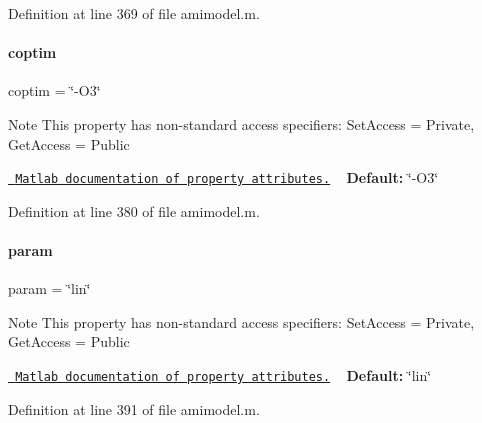 Definition at line 369 of file amimodel.\+m.

\mbox{\label{classamimodel_ad99abcd270ac97546c46292ebc6c2e0a}} 
\paragraph{\texorpdfstring{coptim}{coptim}}
{\footnotesize\ttfamily coptim = \char`\"{}-\/O3\char`\"{}}

\begin{DoxyNote}{Note}
This property has non-\/standard access specifiers\+: {\ttfamily Set\+Access = Private, Get\+Access = Public} 

\href{http://www.mathworks.com/help/matlab/matlab_oop/property-attributes.html}{\texttt{ Matlab documentation of property attributes.}} ~\newline
{\bfseries{Default\+:}} \char`\"{}-\/\+O3\char`\"{} 
\end{DoxyNote}


Definition at line 380 of file amimodel.\+m.

\mbox{\label{classamimodel_a51f20d6b1b54a2eee3be0e8adc96a0ae}} 
\paragraph{\texorpdfstring{param}{param}}
{\footnotesize\ttfamily param = \char`\"{}lin\char`\"{}}

\begin{DoxyNote}{Note}
This property has non-\/standard access specifiers\+: {\ttfamily Set\+Access = Private, Get\+Access = Public} 

\href{http://www.mathworks.com/help/matlab/matlab_oop/property-attributes.html}{\texttt{ Matlab documentation of property attributes.}} ~\newline
{\bfseries{Default\+:}} \char`\"{}lin\char`\"{} 
\end{DoxyNote}


Definition at line 391 of file amimodel.\+m.

\mbox{\label{classamimodel_a0b316a20054ba282555674d939a82406}} 
